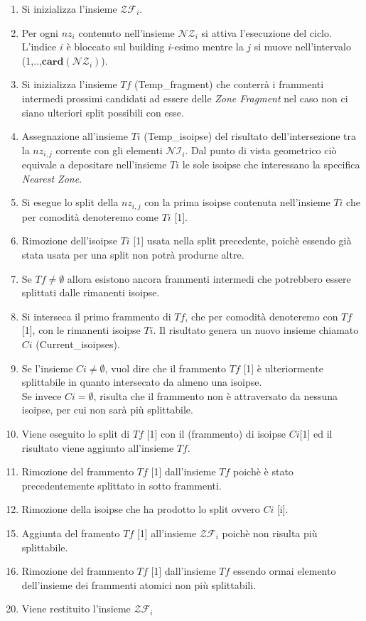 \begin{enumerate}
	\item Si inizializza l'insieme $\mathcal{ZF}_i$.
	\item Per ogni $nz_i$ contenuto nell'insieme $\mathcal{NZ}_i$ si attiva l'esecuzione del ciclo. L'indice $i$ è bloccato sul building $i$-esimo mentre la $j$ si muove nell'intervalo (1,..,$\mathbf{card}(\mathcal{NZ}_i)$).
	\item Si inizializza l'insieme $Tf$ (Temp\_fragment) che conterrà i frammenti intermedi prossimi candidati ad essere delle \textit{Zone Fragment} nel caso non ci siano ulteriori split possibili con esse.
	\item Assegnazione all'insieme $Ti$ (Temp\_isoipse) del risultato dell'intersezione tra la $nz_{i,j}$ corrente con gli elementi $\mathcal{NI}_i$. Dal punto di vista geometrico ciò equivale a depositare nell'insieme $Ti$ le sole isoipse che interessano la specifica \textit{Nearest Zone}. 
	\item Si esegue lo split della $nz_{i,j}$ con la prima isoipse contenuta nell'insieme $Ti$ che per comodità denoteremo come $Ti$ [1].
	\item Rimozione dell'isoipse $Ti$ [1] usata nella split precedente, poichè essendo già stata usata per una split non potrà produrne altre.
	\item Se $Tf \not=\emptyset$ allora esistono ancora frammenti intermedi che potrebbero essere splittati dalle rimanenti isoipse.
	\item Si interseca il primo frammento di $Tf$, che per comodità denoteremo con $Tf$ [1], con le rimanenti isoipse $Ti$. Il risultato genera un nuovo insieme chiamato $Ci$ (Current\_isoipses).
	\item Se l'insieme $Ci \not=\emptyset$, vuol dire che il frammento $Tf$ [1] è ulteriormente splittabile in quanto intersecato da almeno una isoipse.
	\\
	Se invece $Ci =\emptyset$, risulta che il frammento non è attraversato da nessuna isoipse, per cui non sarà più splittabile.
	\item Viene eseguito lo split di $Tf$ [1] con il (frammento) di isoipse $Ci$[1] ed il risultato viene aggiunto all'insieme $Tf$.
	\item Rimozione del frammento $Tf$ [1] dall'insieme $Tf$ poichè è stato precedentemente splittato in sotto frammenti.
	\item Rimozione della isoipse che ha prodotto lo split ovvero $Ci$ [i].
\end{enumerate}
\begin{enumerate}
	\setcounter{enumi}{14}
	\item Aggiunta del framento $Tf$ [1] all'insieme $\mathcal{ZF}_i$  poichè non risulta più splittabile.
	\item Rimozione del frammento $Tf$ [1] dall'insieme $Tf$ essendo ormai elemento dell'insieme dei frammenti atomici non più splittabili.
\end{enumerate}
\begin{enumerate}
		\setcounter{enumi}{19}
		\item Viene restituito l'insieme $\mathcal{ZF}_i$
\end{enumerate}

